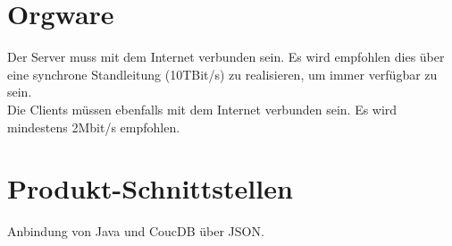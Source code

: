 	\section{Orgware}
	Der Server muss mit dem Internet verbunden sein. Es wird empfohlen dies über eine synchrone Standleitung (10TBit/s) zu realisieren, um immer verfügbar zu sein.\\
	Die Clients müssen ebenfalls mit dem Internet verbunden sein. Es wird mindestens 2Mbit/s empfohlen.
	
	\section{Produkt-Schnittstellen}
	Anbindung von Java und CoucDB über JSON.
